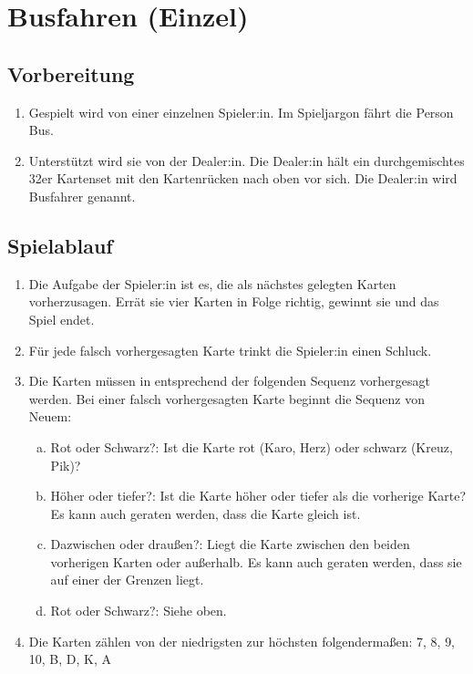 \chapter{Busfahren (Einzel)}\label{Busfahren_solo}
\section{Vorbereitung}
\begin{enumerate}[label={(\arabic*)}]
    \item
    Gespielt wird von einer einzelnen Spieler:in.
    Im Spieljargon \glqq{} fährt die Person Bus\grqq{}.

    \item
    Unterstützt wird sie von der Dealer:in.
    Die Dealer:in hält ein durchgemischtes 32er Kartenset mit den Kartenrücken nach oben vor sich.
    Die Dealer:in wird \glqq{} Busfahrer\grqq{} genannt.
\end{enumerate}

\section{Spielablauf}
\begin{enumerate}[label={(\arabic*)}]
    \item
    Die Aufgabe der Spieler:in ist es, die als nächstes gelegten Karten vorherzusagen.
    Errät sie vier Karten in Folge richtig, gewinnt sie und das Spiel endet.
    
    \item
    Für jede falsch vorhergesagten Karte trinkt die Spieler:in einen Schluck.
    
    \item
    Die Karten müssen in entsprechend der folgenden Sequenz vorhergesagt werden.
    Bei einer falsch vorhergesagten Karte beginnt die Sequenz von Neuem:

    \begin{enumerate}[a.]
        \item\label{Busfahren_solo:Spielablauf:Fragen:RS}
        Rot oder Schwarz?: Ist die Karte rot (Karo, Herz) oder schwarz (Kreuz, Pik)?
        \item
        Höher oder tiefer?: Ist die Karte höher oder tiefer als die vorherige Karte?
        Es kann auch geraten werden, dass die Karte gleich ist.
        \item
        Dazwischen oder draußen?: Liegt die Karte zwischen den beiden vorherigen Karten oder außerhalb.
        Es kann auch geraten werden, dass sie auf einer der Grenzen liegt.
        \item
        Rot oder Schwarz?: Siehe oben.
    \end{enumerate}

    \item
    Die Karten zählen von der niedrigsten zur höchsten folgendermaßen: 7, 8, 9, 10, B, D, K, A
\end{enumerate}
